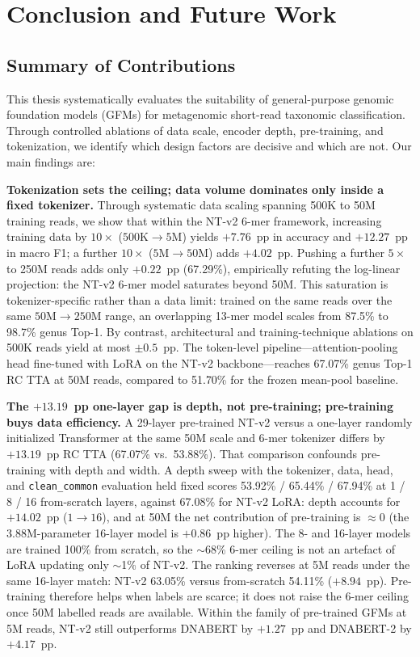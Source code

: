 
\chapter{Conclusion and Future Work}
\label{ch:conclusion}

\section{Summary of Contributions}

This thesis systematically evaluates the suitability of general-purpose genomic foundation models (GFMs) for metagenomic short-read taxonomic classification. Through controlled ablations of data scale, encoder depth, pre-training, and tokenization, we identify which design factors are decisive and which are not. Our main findings are:

\textbf{Tokenization sets the ceiling; data volume dominates only inside a fixed tokenizer.} Through systematic data scaling spanning 500K to 50M training reads, we show that within the NT-v2 6-mer framework, increasing training data by $10\times$ ($500\text{K}\to 5\text{M}$) yields $+7.76$~pp in accuracy and $+12.27$~pp in macro F1; a further $10\times$ ($5\text{M}\to 50\text{M}$) adds $+4.02$~pp. Pushing a further $5\times$ to 250M reads adds only $+0.22$~pp (67.29\%), empirically refuting the log-linear projection: the NT-v2 6-mer model saturates beyond 50M. This saturation is tokenizer-specific rather than a data limit: trained on the same reads over the same $50\text{M}\to250\text{M}$ range, an overlapping 13-mer model scales from 87.5\% to 98.7\% genus Top-1. By contrast, architectural and training-technique ablations on 500K reads yield at most $\pm0.5$~pp. The token-level pipeline---attention-pooling head fine-tuned with LoRA on the NT-v2 backbone---reaches 67.07\% genus Top-1 RC TTA at 50M reads, compared to 51.70\% for the frozen mean-pool baseline.

\textbf{The $+13.19$~pp one-layer gap is depth, not pre-training; pre-training buys data efficiency.} A 29-layer pre-trained NT-v2 versus a one-layer randomly initialized Transformer at the same 50M scale and 6-mer tokenizer differs by $+13.19$~pp RC TTA (67.07\% vs.\ 53.88\%). That comparison confounds pre-training with depth and width. A depth sweep with the tokenizer, data, head, and \texttt{clean\_common} evaluation held fixed scores 53.92\% / 65.44\% / 67.94\% at 1 / 8 / 16 from-scratch layers, against 67.08\% for NT-v2 LoRA: depth accounts for $+14.02$~pp ($1\to 16$), and at 50M the net contribution of pre-training is $\approx 0$ (the 3.88M-parameter 16-layer model is $+0.86$~pp higher). The 8- and 16-layer models are trained 100\% from scratch, so the $\sim$68\% 6-mer ceiling is not an artefact of LoRA updating only $\sim$1\% of NT-v2. The ranking reverses at 5M reads under the same 16-layer match: NT-v2 63.05\% versus from-scratch 54.11\% ($+8.94$~pp). Pre-training therefore helps when labels are scarce; it does not raise the 6-mer ceiling once 50M labelled reads are available. Within the family of pre-trained GFMs at 5M reads, NT-v2 still outperforms DNABERT by $+1.27$~pp and DNABERT-2 by $+4.17$~pp.

